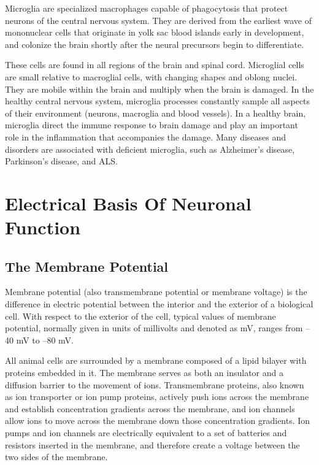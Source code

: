 Microglia are specialized macrophages capable of phagocytosis that protect neurons of the central nervous system. They are derived from the earliest wave of mononuclear cells that originate in yolk sac blood islands early in development, and colonize the brain shortly after the neural precursors begin to differentiate.

These cells are found in all regions of the brain and spinal cord. Microglial cells are small relative to macroglial cells, with changing shapes and oblong nuclei. They are mobile within the brain and multiply when the brain is damaged. In the healthy central nervous system, microglia processes constantly sample all aspects of their environment (neurons, macroglia and blood vessels). In a healthy brain, microglia direct the immune response to brain damage and play an important role in the inflammation that accompanies the damage. Many diseases and disorders are associated with deficient microglia, such as Alzheimer's disease, Parkinson's disease, and ALS.

\hypertarget{electrical-basis-of-neuronal-function}{%
\chapter{Electrical Basis Of Neuronal Function}\label{electrical-basis-of-neuronal-function}}

\hypertarget{the-membrane-potential}{%
\section{The Membrane Potential}\label{the-membrane-potential}}

Membrane potential (also transmembrane potential or membrane voltage) is the difference in electric potential between the interior and the exterior of a biological cell. With respect to the exterior of the cell, typical values of membrane potential, normally given in units of millivolts and denoted as mV, ranges from --40 mV to --80 mV.

All animal cells are surrounded by a membrane composed of a lipid bilayer with proteins embedded in it. The membrane serves as both an insulator and a diffusion barrier to the movement of ions. Transmembrane proteins, also known as ion transporter or ion pump proteins, actively push ions across the membrane and establish concentration gradients across the membrane, and ion channels allow ions to move across the membrane down those concentration gradients. Ion pumps and ion channels are electrically equivalent to a set of batteries and resistors inserted in the membrane, and therefore create a voltage between the two sides of the membrane.

